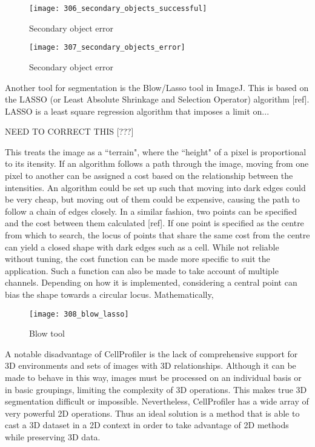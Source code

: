 \begin{figure}[p]
 \centering
 \texttt{[image: 306\_secondary\_objects\_successful]}
 \caption{
 	Secondary object error
 }
 \label{fig:secondaryobjectsuccess}
\end{figure}

\begin{figure}[p]
 \centering
 \texttt{[image: 307\_secondary\_objects\_error]}
 \caption{
 	Secondary object error
 }
 \label{fig:secondaryobjecterror}
\end{figure}

Another tool for segmentation is the Blow/Lasso tool in ImageJ. This is based on the LASSO (or Least Absolute Shrinkage and Selection Operator) algorithm [ref]. LASSO is a least square regression algorithm that imposes a limit on...

NEED TO CORRECT THIS [???]

This treats the image as a ``terrain", where the ``height" of a pixel is proportional to its itensity. If an algorithm follows a path through the image, moving from one pixel to another can be assigned a cost based on the relationship between the intensities. An algorithm could be set up such that moving into dark edges could be very cheap, but moving out of them could be expensive, causing the path to follow a chain of edges closely. In a similar fashion, two points can be specified and the cost between them calculated [ref]. If one point is specified as the centre from which to search, the locus of points that share the same cost from the centre can yield a closed shape with dark edges such as a cell. While not reliable without tuning, the cost function can be made more specific to suit the application. Such a function can also be made to take account of multiple channels. Depending on how it is implemented, considering a central point can bias the shape towards a circular locus. Mathematically,

\begin{figure}[p]
 \centering
 \texttt{[image: 308\_blow\_lasso]}
 \caption{
 	Blow tool
 }
 \label{fig:blow}
\end{figure}

A notable disadvantage of CellProfiler is the lack of comprehensive support for 3D environments and sets of images with 3D relationships. Although it can be made to behave in this way, images must be processed on an individual basis or in basic groupings, limiting the complexity of 3D operations. This makes true 3D segmentation difficult or impossible. Nevertheless, CellProfiler has a wide array of very powerful 2D operations. Thus an ideal solution is a method that is able to cast a 3D dataset in a 2D context in order to take advantage of 2D methods while preserving 3D data.

